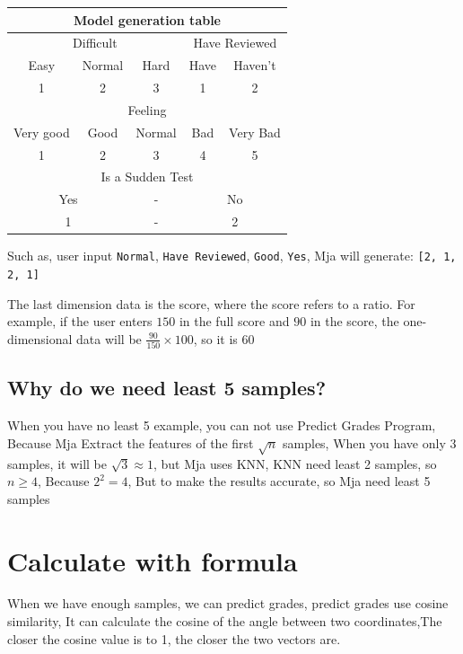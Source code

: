\documentclass{article}
\begin{document}
\begin{tabular}{|c|c|c|c|c|}
\hline
\multicolumn{5}{|c|}{\large Model generation table}
\\\hline
\multicolumn{3}{|c|}{Difficult}
& \multicolumn{2}{|c|}{Have Reviewed}
\\\hline
Easy & Normal & Hard & Have & Haven't \\\hline
1    & 2        & 3  & 1    & 2       \\\hline
\hline
\multicolumn{5}{|c|}{Feeling}\\\hline
Very good & Good & Normal & Bad & Very Bad \\\hline
1 & 2 & 3 & 4 & 5 \\\hline
\hline
\multicolumn{5}{|c|}{Is a Sudden Test}\\\hline
\multicolumn{2}{|c|}{Yes}
& -
& \multicolumn{2}{|c|}{No}\\\hline
\multicolumn{2}{|c|}{1}
& -
& \multicolumn{2}{|c|}{2}\\\hline
\end{tabular}


Such as, user input \verb|Normal|, \verb|Have Reviewed|, 
\verb|Good|, \verb|Yes|, Mja will generate: \verb|[2, 1, 2, 1]|


The last dimension data is the score, 
where the score refers to a ratio. 
For example, if the user 
enters $150$ in the full score 
and $90$ in the score, 
the one-dimensional data 
will be $\frac{90}{150} \times 100$, 
so it is $60$
\subsection{Why do we need least 5 samples?}
When you have no least 5 example, you can not use 
Predict Grades Program, Because Mja Extract the features of the 
first $\sqrt{n}$ samples, When you have only $3$ samples, it will be 
$\sqrt{3} \approx 1$, but Mja uses KNN, KNN need least 2 samples, so 
$n \geq 4$, Because $2^2 = 4$, But to make the results accurate,
so Mja need least 5 samples

\newpage

\section{Calculate with formula}
When we have enough samples, we can 
predict grades, predict grades use cosine 
similarity, It can calculate the cosine of the 
angle between two coordinates,The closer the cosine value is to 1, 
the closer the two vectors are.
\end{document}
